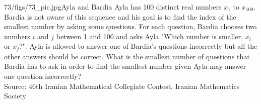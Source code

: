 \begin{problem}{73/figs/73_pic.jpg}{Ayla and Bardia} Ayla has 100 distinct real numbers $x_1$ to $x_{100}$. Bardia is not aware of this sequence and his goal is to find the index of the smallest number by asking some questions. For each question, Bardia chooses two numbers $i$ and $j$ between 1 and 100 and asks Ayla "Which number is smaller, $x_i$ or $x_j?$". Ayla is allowed to answer one of Bardia's questions incorrectly but all the other answers should be correct. What is the smallest number of questions that Bardia has to ask in order to find the smallest number given Ayla may answer one question incorrectly?\\[0.2cm]
	
Source: 46th Iranian Mathematical Collegiate Contest, Iranian Mathematics Society
\end{problem}